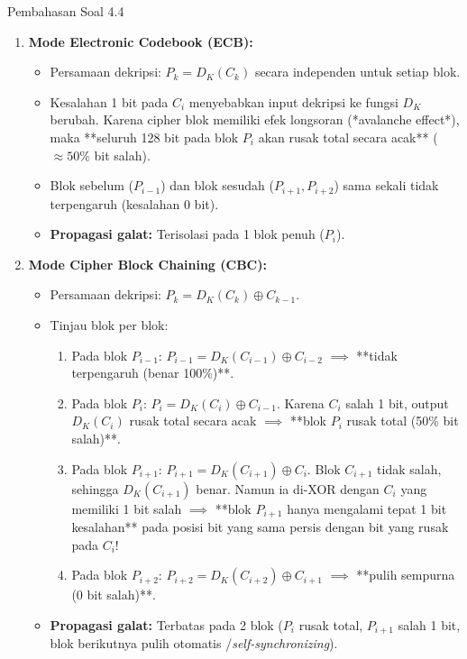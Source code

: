 \documentclass[11pt,a4paper]{article}
\begin{document}
\begin{solusibox}{Pembahasan Soal 4.4}
\begin{enumerate}[leftmargin=*]
    \item \textbf{Mode Electronic Codebook (ECB):}
    \begin{itemize}
        \item Persamaan dekripsi: $P_k = D_K(C_k)$ secara independen untuk setiap blok.
        \item Kesalahan 1 bit pada $C_i$ menyebabkan input dekripsi ke fungsi $D_K$ berubah. Karena cipher blok memiliki efek longsoran (*avalanche effect*), maka **seluruh 128 bit pada blok $P_i$ akan rusak total secara acak** ($\approx 50\%$ bit salah).
        \item Blok sebelum ($P_{i-1}$) dan blok sesudah ($P_{i+1}, P_{i+2}$) sama sekali tidak terpengaruh (kesalahan 0 bit).
        \item \textbf{Propagasi galat:} Terisolasi pada 1 blok penuh ($P_i$).
    \end{itemize}
    \item \textbf{Mode Cipher Block Chaining (CBC):}
    \begin{itemize}
        \item Persamaan dekripsi: $P_k = D_K(C_k) \oplus C_{k-1}$.
        \item Tinjau blok per blok:
        \begin{enumerate}
            \item Pada blok $P_{i-1}$: $P_{i-1} = D_K(C_{i-1}) \oplus C_{i-2}$ $\implies$ **tidak terpengaruh (benar 100\%)**.
            \item Pada blok $P_i$: $P_i = D_K(C_i) \oplus C_{i-1}$. Karena $C_i$ salah 1 bit, output $D_K(C_i)$ rusak total secara acak $\implies$ **blok $P_i$ rusak total (50\% bit salah)**.
            \item Pada blok $P_{i+1}$: $P_{i+1} = D_K(C_{i+1}) \oplus C_i$. Blok $C_{i+1}$ tidak salah, sehingga $D_K(C_{i+1})$ benar. Namun ia di-XOR dengan $C_i$ yang memiliki 1 bit salah $\implies$ **blok $P_{i+1}$ hanya mengalami tepat 1 bit kesalahan** pada posisi bit yang sama persis dengan bit yang rusak pada $C_i$!
            \item Pada blok $P_{i+2}$: $P_{i+2} = D_K(C_{i+2}) \oplus C_{i+1}$ $\implies$ **pulih sempurna (0 bit salah)**.
        \end{enumerate}
        \item \textbf{Propagasi galat:} Terbatas pada 2 blok ($P_i$ rusak total, $P_{i+1}$ salah 1 bit, blok berikutnya pulih otomatis /\textit{self-synchronizing}).

\end{itemize}
\end{enumerate}
\end{solusibox}
\end{document}
